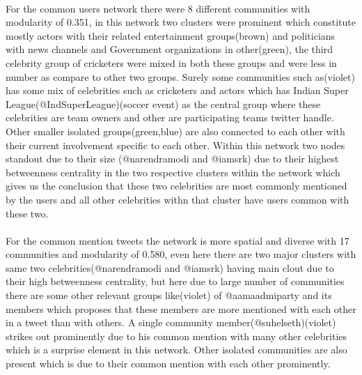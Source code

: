 \documentclass[runningheads,a4paper]{llncs}
\begin{document}
\paragraph{}
For the common users network there were 8 different communities with modularity of 0.351, in this network two clusters were prominent which constitute mostly actors with their related entertainment groups(brown) and politicians with news channels and Government organizations in other(green), the third celebrity group of cricketers were mixed in both these groups and were less in number as compare to other two groups. Surely some communities such as(violet) has some mix of celebrities such as cricketers and actors which has Indian Super League(@IndSuperLeague)(soccer event) as the central group where these celebrities are team owners and other are participating teams twitter handle. Other smaller isolated groups(green,blue) are also connected to each other with their current involvement specific to each other. Within this network two nodes standout due to their size (@narendramodi and @iamsrk) due to their highest betweenness centrality in the two respective clusters within the network which gives us the conclusion that these two celebrities are most commonly mentioned by the users and all other celebrities withn that cluster have users common with these two.

\paragraph{}
For the common mention tweets the network is more spatial and diverse with 17 communities and modularity of 0.580, even here there are two major clusters with same two celebrities(@narendramodi and @iamsrk) having main clout due to their high betweenness centrality, but here due to large number of communities there are some other relevant groups like(violet) of @aamaadmiparty and its members which proposes that these members are more mentioned with each other in a tweet than with others. A single community member(@suhelseth)(violet) strikes out prominently due to his common mention with many other celebrities which is a surprise element in this network. Other isolated communities are also present which is due to their common mention with each other prominently.
\end{document}
